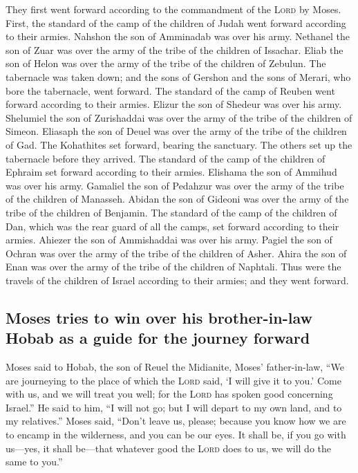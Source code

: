  They first went forward according to the commandment of
the \textsc{Lord} by Moses.  First, the standard of the
camp of the children of Judah went forward according to their armies.
Nahshon the son of Amminadab was over his army.  Nethanel
the son of Zuar was over the army of the tribe of the children of
Issachar.  Eliab the son of Helon was over the army of
the tribe of the children of Zebulun.  The tabernacle was
taken down; and the sons of Gershon and the sons of Merari, who bore the
tabernacle, went forward.  The standard of the camp of
Reuben went forward according to their armies. Elizur the son of Shedeur
was over his army.  Shelumiel the son of Zurishaddai was
over the army of the tribe of the children of Simeon. 
Eliasaph the son of Deuel was over the army of the tribe of the children
of Gad.  The Kohathites set forward, bearing the
sanctuary. The others set up the tabernacle before they arrived.
 The standard of the camp of the children of Ephraim set
forward according to their armies. Elishama the son of Ammihud was over
his army.  Gamaliel the son of Pedahzur was over the army
of the tribe of the children of Manasseh.  Abidan the son
of Gideoni was over the army of the tribe of the children of Benjamin.
 The standard of the camp of the children of Dan, which
was the rear guard of all the camps, set forward according to their
armies. Ahiezer the son of Ammishaddai was over his army.
 Pagiel the son of Ochran was over the army of the tribe
of the children of Asher.  Ahira the son of Enan was over
the army of the tribe of the children of Naphtali.  Thus
were the travels of the children of Israel according to their armies;
and they went forward.

\hypertarget{moses-tries-to-win-over-his-brother-in-law-hobab-as-a-guide-for-the-journey-forward}{%
\subsection{Moses tries to win over his brother-in-law Hobab as a guide
for the journey
forward}\label{moses-tries-to-win-over-his-brother-in-law-hobab-as-a-guide-for-the-journey-forward}}

 Moses said to Hobab, the son of Reuel the Midianite,
Moses' father-in-law, ``We are journeying to the place of which the
\textsc{Lord} said, `I will give it to you.' Come with us, and we will
treat you well; for the \textsc{Lord} has spoken good concerning
Israel.''  He said to him, ``I will not go; but I will
depart to my own land, and to my relatives.''  Moses
said, ``Don't leave us, please; because you know how we are to encamp in
the wilderness, and you can be our eyes.  It shall be, if
you go with us---yes, it shall be---that whatever good the \textsc{Lord}
does to us, we will do the same to you.''

